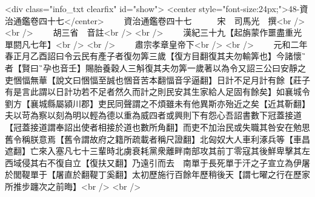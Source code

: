 <div class="info_txt clearfix" id="show">
<center style="font-size:24px;">48-資治通鑑卷四十七</center>
  　　資治通鑑卷四十七　　　宋　司馬光　撰<br />
<br />
　　胡三省　音註<br />
<br />
　　漢紀三十九【起旃蒙作噩盡重光單閼凡七年】<br />
<br />
　　肅宗孝章皇帝下<br />
<br />
　　元和二年春正月乙酉詔曰令云民有產子者復勿筭三歲【復方目翻復其夫勿輸筭也】今諸懷者【賢曰孕也音壬】賜胎養穀人三斛復其夫勿筭一歲著以為令又詔三公曰安靜之吏悃愊無華【說文曰悃愊至誠也悃音苦本翻愊音孚逼翻】日計不足月計有餘【莊子有是言此謂以日計功若不足者然久而計之則民安其生家給人足固有餘矣】如襄城令劉方【襄城縣屬潁川郡】吏民同聲謂之不煩雖未有他異斯亦殆近之矣【近其靳翻】夫以苛為察以刻為明以輕為德以重為威四者或興則下有怨心吾詔書數下冠蓋接道【冠蓋接道謂奉詔出使者相接於道也數所角翻】而吏不加治民或失職其咎安在勉思舊令稱朕意焉【舊令謂故府之籍所疏載者稱尺證翻】北匈奴大人車利涿兵等【車昌遮翻】亡來入塞凡七十三輩時北虜衰耗黨衆離畔南部攻其前丁零寇其後鮮卑擊其左西域侵其右不復自立【復扶又翻】乃遠引而去　南單于長死單于汗之子宣立為伊屠於閭鞮單于【屠直於翻鞮丁奚翻】太初歷施行百餘年歷稍後天【謂七曜之行在歷家所推步躔次之前晦】<br />
<br />
